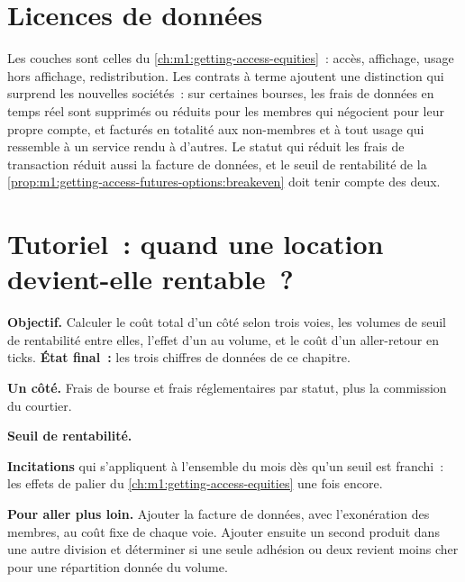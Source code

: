\section{Licences de données}

Les couches sont celles du \cref{ch:m1:getting-access-equities}~: accès, affichage,
usage hors affichage, redistribution. Les contrats à terme ajoutent une distinction qui surprend les
nouvelles sociétés~: sur certaines bourses, les frais de données en temps réel sont supprimés ou réduits pour
les membres qui négocient pour leur propre compte, et facturés en totalité aux non-membres et à
tout usage qui ressemble à un service rendu à d'autres. Le statut qui réduit les frais de transaction
réduit aussi la facture de données, et le seuil de rentabilité de la
\cref{prop:m1:getting-access-futures-options:breakeven} doit tenir compte des deux.

\section{Tutoriel~: quand une location devient-elle rentable~?}\label{tut:m1:getting-access-futures-options:lease}

\begin{tutorial}
\textbf{Objectif.} Calculer le coût total d'un côté selon trois voies, les
volumes de seuil de rentabilité entre elles, l'effet d'un  au volume, et le
coût d'un aller-retour en ticks. \textbf{État final~:} les trois chiffres
de données de ce chapitre.
\begin{tutsteps}
\item \textbf{Un côté.} Frais de bourse et frais réglementaires par statut, plus la
commission du courtier.
\label{lst:m1:getting-access-futures-options:fees}
\item \textbf{Seuil de rentabilité.}
\label{lst:m1:getting-access-futures-options:breakeven}
\item \textbf{Incitations} qui s'appliquent à l'ensemble du mois dès qu'un seuil est
franchi~: les effets de palier du \cref{ch:m1:getting-access-equities} une fois encore.
\end{tutsteps}
\textbf{Pour aller plus loin.} Ajouter la facture de données, avec l'exonération des membres, au
coût fixe de chaque voie. Ajouter ensuite un second produit dans une autre division et
déterminer si une seule adhésion ou deux revient moins cher pour une répartition donnée du volume.
\end{tutorial}

